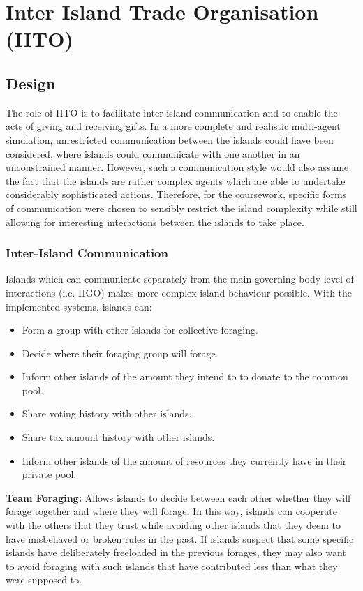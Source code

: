 \chapter{Inter Island Trade Organisation (IITO)}

\section{Design}
\label{sec:IITO:Design}

The role of IITO is to facilitate inter-island communication and to enable the acts of giving and receiving gifts. In a more complete and realistic multi-agent simulation, unrestricted communication between the islands could have been considered, where islands could communicate with one another in an unconstrained manner. However, such a communication style would also assume the fact that the islands are rather complex agents which are able to undertake considerably sophisticated actions. Therefore, for the coursework, specific forms of communication were chosen to sensibly restrict the island complexity while still allowing for interesting interactions between the islands to take place.

\subsection{Inter-Island Communication}  
\label{subsec:IITO:inter_island_communication}

Islands which can communicate separately from the main governing body level of interactions (i.e. IIGO) makes more complex island behaviour possible. With the implemented systems, islands can:

\begin{itemize}
    \item Form a group with other islands for collective foraging.
    \item Decide where their foraging group will forage.
    \item Inform other islands of the amount they intend to to donate to the common pool.
    \item Share voting history with other islands.
    \item Share tax amount history with other islands.
    \item Inform other islands of the amount of resources they currently have in their private pool.
\end{itemize}

\textbf{Team Foraging:} Allows islands to decide between each other whether they will forage together and where they will forage. In this way, islands can cooperate with the others that they trust while avoiding other islands that they deem to have misbehaved or broken rules in the past. If islands suspect that some specific islands have deliberately freeloaded in the previous forages, they may also want to avoid foraging with such islands that have contributed less than what they were supposed to.

